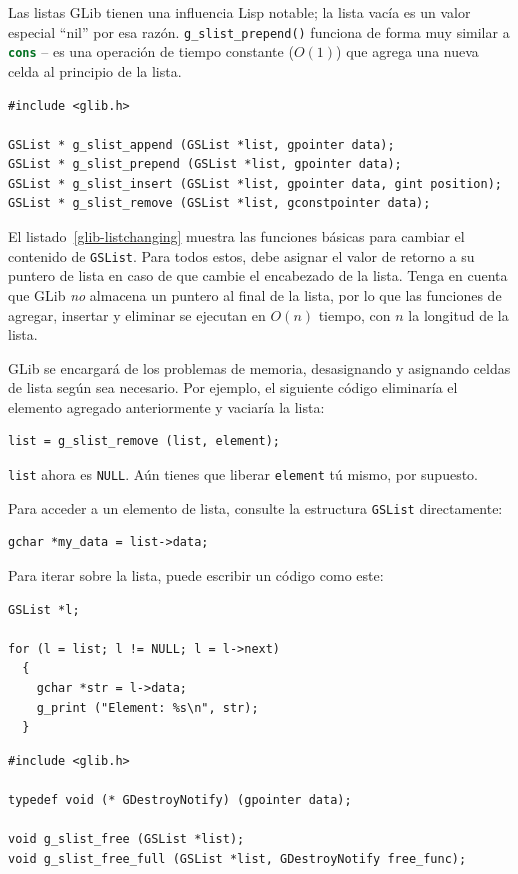 Las listas GLib tienen una influencia Lisp notable; la lista vacía es un valor especial ``nil'' por esa razón. \lstinline{g_slist_prepend()} funciona de forma muy similar a \lstinline[language=Lisp]{cons} -- es una operación de tiempo constante ($O(1)$) que agrega una nueva celda al principio de la lista.

\begin{lstlisting}[float, caption={Cambiar el contenido de la lista vinculada}, label=glib-listchanging]
#include <glib.h>

GSList * g_slist_append (GSList *list, gpointer data);
GSList * g_slist_prepend (GSList *list, gpointer data);
GSList * g_slist_insert (GSList *list, gpointer data, gint position);
GSList * g_slist_remove (GSList *list, gconstpointer data);
\end{lstlisting}

El listado~\ref{glib-listchanging} muestra las funciones básicas para cambiar el contenido de \lstinline{GSList}. Para todos estos, debe asignar el valor de retorno a su puntero de lista en caso de que cambie el encabezado de la lista. Tenga en cuenta que GLib \emph{no} almacena un puntero al final de la lista, por lo que las funciones de agregar, insertar y eliminar se ejecutan en $O(n)$ tiempo, con $n$ la longitud de la lista.

GLib se encargará de los problemas de memoria, desasignando y asignando celdas de lista según sea necesario. Por ejemplo, el siguiente código eliminaría el elemento agregado anteriormente y vaciaría la lista:
\begin{lstlisting}
list = g_slist_remove (list, element);
\end{lstlisting}

\lstinline{list} ahora es \lstinline{NULL}. Aún tienes que liberar \lstinline{element} tú mismo, por supuesto.

Para acceder a un elemento de lista, consulte la estructura \lstinline{GSList} directamente:
\begin{lstlisting}
gchar *my_data = list->data;
\end{lstlisting}

Para iterar sobre la lista, puede escribir un código como este:
\begin{lstlisting}
GSList *l;

for (l = list; l != NULL; l = l->next)
  {
    gchar *str = l->data;
    g_print ("Element: %s\n", str);
  }
\end{lstlisting}

\begin{lstlisting}[float, caption={Liberar listas enteras vinculadas}, label=glib-listfree]
#include <glib.h>

typedef void (* GDestroyNotify) (gpointer data);

void g_slist_free (GSList *list);
void g_slist_free_full (GSList *list, GDestroyNotify free_func);
\end{lstlisting}

